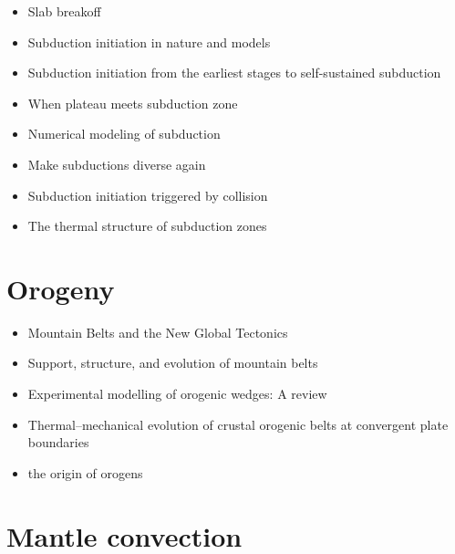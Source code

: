 \begin{itemize}
   \item [\twothousandeighteen] Slab breakoff \cite{garm18}
   \item [\twothousandeighteen] Subduction initiation in nature and models \cite{stge18}
   \item [\twothousandtwentyone] Subduction initiation from the earliest stages to self-sustained subduction \cite{laar21}
   \item [\twothousandtwentyone] When plateau meets subduction zone \cite{lidl21}
   \item [\twothousandtwentytwo] Numerical modeling of subduction \cite{gery22}
   \item [\twothousandtwentytwo] Make subductions diverse again \cite{chmm22}
   \item [\twothousandtwentytwo] Subduction initiation triggered by collision \cite{yang22} 
   \item [\twothousandtwentythree] The thermal structure of subduction zones \cite{vawi23,wiva23}
   \end{itemize}

\section{Orogeny}
   \begin{itemize}
   \item [\nineteenseventy] Mountain Belts and the New Global Tectonics  \cite{debi70}
   \item [\nineteeneightyeight] Support, structure, and evolution of mountain belts \cite{moly88}
   \item [\twothousandtwelve] Experimental modelling of orogenic wedges: A review \cite{grmd12} 
   \item [\twothousandtwelve] Thermal–mechanical evolution of crustal orogenic belts at convergent plate boundaries \cite{vand12}
   \item [\twothousandthirteen] the origin of orogens \cite{jabe13}
   \end{itemize}

\section{Mantle convection}

